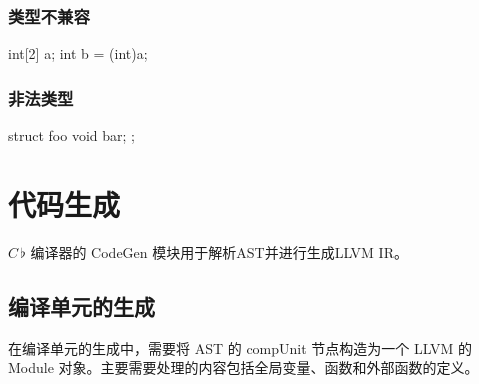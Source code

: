 \documentclass{ctexrep}
\newcommand{\cb}{$C\,\flat$\xspace}
\begin{document}
\subsubsection{类型不兼容}
\begin{runcompiler}
int[2] a;
int b = (int)a;
\end{runcompiler}
\subsubsection{非法类型}
\begin{runcompiler}
struct foo{
    void bar;
};
\end{runcompiler}

\section{代码生成}

\cb 编译器的 CodeGen 模块用于解析AST并进行生成LLVM IR。

\subsection{编译单元的生成}

在编译单元的生成中，需要将 AST 的 compUnit 节点构造为一个 LLVM 的 Module 对象。主要需要处理的内容包括全局变量、函数和外部函数的定义。
\end{document}
